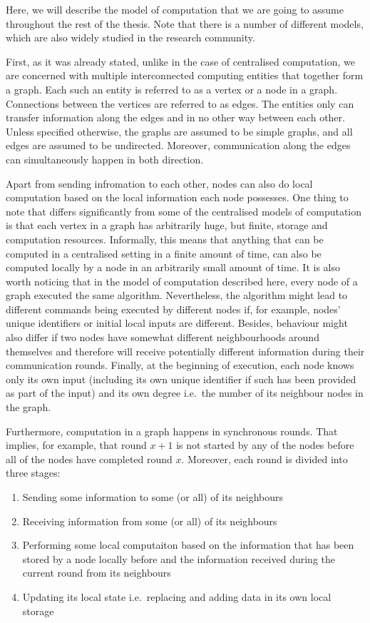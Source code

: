 Here, we will describe the model of computation that we are going to
assume throughout the rest of the thesis. Note that there is a number
of different models, which are also widely studied in the research
community.

First, as it was already stated, unlike in the case of centralised
computation, we are concerned with multiple interconnected computing entities
that together form a graph. Each such an entity is referred to as a vertex or
a node in a graph. Connections between the vertices are referred to as edges.
The entities only can transfer information along the edges and in no other way
between each other. Unless specified otherwise, the graphs are assumed to be
simple graphs, and all edges are assumed to be undirected. Moreover,
communication along the edges can simultaneously happen in both direction.

Apart from sending infromation to each other, nodes can also
do local computation based on the local information each node possesses. One thing
to note that differs significantly from some of the centralised models of computation
is that each vertex in a graph has arbitrarily huge, but finite, storage and computation resources.
Informally, this means that anything that can be computed in a centralised setting
in a finite amount of time,
can also be computed locally by a node in an arbitrarily small amount of time.
It is also worth noticing that in the model of computation described here,
every node of a graph executed the same algorithm. Nevertheless, the
algorithm might lead to different commands being executed by different nodes
if, for example, nodes' unique identifiers or initial local inputs are different.
Besides, behaviour might also differ if two nodes have somewhat different neighbourhoods
around themselves and therefore will receive potentially different
information during their communication rounds. Finally, at the beginning of
execution, each node knows only its own input (including its own unique identifier
if such has been provided as part of the input) and its own degree i.e.\ the number of
its neighbour nodes in the graph.

Furthermore, computation in a graph happens in synchronous rounds. That implies,
for example, that round $x+1$ is not started by any of the nodes before all of the
nodes have completed round $x$. Moreover, each round is divided into three stages:

\begin{enumerate}
\item Sending some information to some (or all) of its neighbours

\item Receiving information
from some (or all) of its neighbours

\item Performing some local computaiton based
on the information that has been stored by a node locally before and the information
received during the current round from its neighbours

\item Updating its local state i.e.\ replacing and adding data in its own local storage
\end{enumerate}

